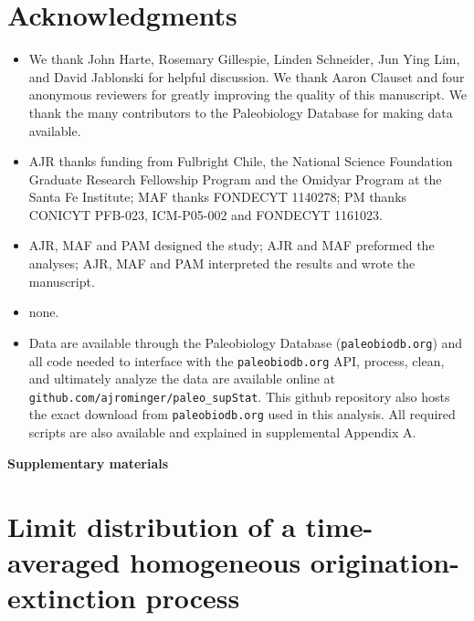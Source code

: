 \documentclass[12pt]{article}
\begin{document}
\section*{Acknowledgments}
\begin{itemize}
\item[{\bf General:}] We thank John Harte, Rosemary Gillespie, Linden
  Schneider, Jun Ying Lim, and David Jablonski for helpful
  discussion. We thank Aaron Clauset and four anonymous reviewers for
  greatly improving the quality of this manuscript. We thank the many
  contributors to the Paleobiology Database for making data available.
\item[{\bf Funding:}] AJR thanks funding from Fulbright Chile, the
  National Science Foundation Graduate Research Fellowship Program and
  the Omidyar Program at the Santa Fe Institute; MAF thanks FONDECYT
  1140278; PM thanks CONICYT PFB-023, ICM-P05-002 and FONDECYT
  1161023.
\item[{\bf Author contributions:}] AJR, MAF and PAM designed the
  study; AJR and MAF preformed the analyses; AJR, MAF and PAM
  interpreted the results and wrote the manuscript.
\item[{\bf Competing interests:}] none.
\item[{\bf Data and materials availability:}] Data are available
  through the Paleobiology Database ({\tt paleobiodb.org}) and all
  code needed to interface with the {\tt paleobiodb.org} API, process,
  clean, and ultimately analyze the data are available online at {\tt
    github.com/ajrominger/paleo\_supStat}. This github repository also
  hosts the exact download from {\tt paleobiodb.org} used in this
  analysis. All required scripts are also available and explained in
  supplemental Appendix A.
\end{itemize}


\clearpage

\newcommand{\beginsupplement}{%
  \setcounter{table}{0}
  \renewcommand{\thetable}{S\arabic{table}}%
  \setcounter{figure}{0}
  \renewcommand{\thefigure}{S\arabic{figure}}%
  \setcounter{section}{0}
  \renewcommand{\thesection}{S\arabic{section}}%
}

\beginsupplement

\begin{center}
{\LARGE \bf Supplementary materials}
\end{center}
\vspace{2em}

\section{Limit distribution of a time-averaged homogeneous
  origination-extinction process}
\label{sec:suppLimitDist}
\end{document}
